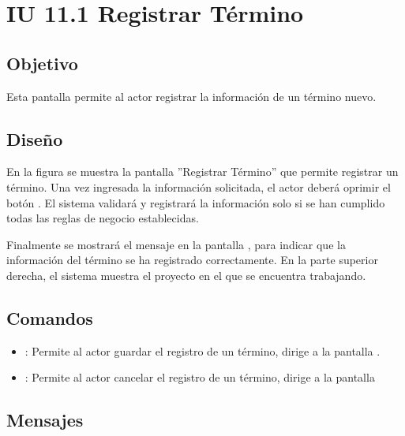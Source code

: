 \section{IU 11.1 Registrar Término}

\subsection{Objetivo}
	Esta pantalla permite al actor registrar la información de un término nuevo.
\subsection{Diseño}
	En la figura  se muestra la pantalla ''Registrar Término'' que permite registrar un término.
	Una vez ingresada la información solicitada, el actor deberá oprimir el botón  . El sistema validará y registrará la información solo si se han cumplido todas las reglas de negocio establecidas.
	
	Finalmente se mostrará el mensaje  en la pantalla , para indicar que la información del término se ha registrado correctamente.
	En la parte superior derecha, el sistema muestra el proyecto en el que se encuentra trabajando.

\subsection{Comandos}
\begin{itemize}
	\item {}: Permite al actor guardar el registro de un término, dirige a la pantalla .
	\item {}: Permite al actor cancelar el registro de un término, dirige a la pantalla 
\end{itemize}

\subsection{Mensajes}

